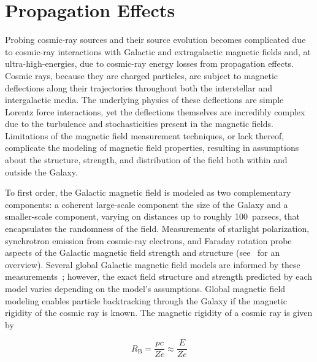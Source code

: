 

\section{Propagation Effects}\label{sec:propagation}
Probing cosmic-ray sources and their source evolution becomes complicated due to cosmic-ray interactions with Galactic and extragalactic magnetic fields and, at ultra-high-energies, due to cosmic-ray energy losses from propagation effects.
Cosmic rays, because they are charged particles, are subject to magnetic deflections along their trajectories throughout both the interstellar and intergalactic media.
The underlying physics of these deflections are simple Lorentz force interactions, yet the deflections themselves are incredibly complex due to the turbulence and stochasticities present in the magnetic fields.
Limitations of the magnetic field measurement techniques, or lack thereof, complicate the modeling of magnetic field properties, resulting in assumptions about the structure, strength, and distribution of the field both within and outside the Galaxy.

To first order, the Galactic magnetic field is modeled as two complementary components: a coherent large-scale component the size of the Galaxy and a smaller-scale component, varying on distances up to roughly \qty{100}{parsecs}, that encapsulates the randomness of the field.
Measurements of starlight polarization, synchrotron emission from cosmic-ray electrons, and Faraday rotation probe aspects of the Galactic magnetic field strength and structure (see~\cite{jaffe_galaxies2019_gmf,haverkorn_arxiv2026_gmf} for an overview). 
Several global Galactic magnetic field models are informed by these measurements~\cite{jansson_apj2012_gmf,jansson_apjl2012_gmf,unger_apj2023_gmf,unger_arxiv2026_gmf}; however, the exact field structure and strength predicted by each model varies depending on the model's assumptions.
Global magnetic field modeling enables particle backtracking through the Galaxy if the magnetic rigidity of the cosmic ray is known.
The magnetic rigidity of a cosmic ray is given by

\begin{equation}
  R_{\text{B}} = \frac{pc}{Ze} \approx \frac{E}{Ze} \label{eq:rigidity}
\end{equation}

